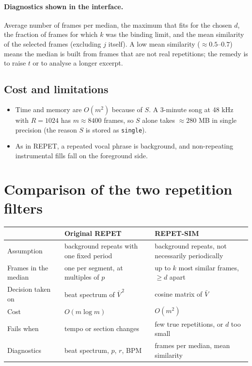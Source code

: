\documentclass[11pt,a4paper]{article}
\newcommand{\code}[1]{\texttt{#1}}
\begin{document}
\paragraph{Diagnostics shown in the interface.} Average number of frames
per median, the maximum that fits for the chosen $d$, the fraction of frames
for which $k$ was the binding limit, and the mean similarity of the selected
frames (excluding $j$ itself). A low mean similarity ($\approx0.5$--$0.7$)
means the median is built from frames that are not real repetitions; the
remedy is to raise $t$ or to analyse a longer excerpt.

\subsection{Cost and limitations}
\begin{itemize}
  \item Time and memory are $O(m^2)$ because of $S$. A 3-minute song at
        48 kHz with $R=1024$ has $m\approx8400$ frames, so $S$ alone takes
        $\approx280$ MB in single precision (the reason $S$ is stored as
        \code{single}).
  \item As in REPET, a repeated vocal phrase is background, and
        non-repeating instrumental fills fall on the foreground side.
\end{itemize}

\section{Comparison of the two repetition filters}

\begin{table}[htbp]
\centering
\begin{tabularx}{\linewidth}{@{}lLL@{}}
\toprule
 & Original REPET & REPET-SIM \\
\midrule
Assumption & background repeats with one fixed period & background repeats, not necessarily periodically \\
Frames in the median & one per segment, at multiples of $p$ & up to $k$ most similar frames, $\ge d$ apart \\
Decision taken on & beat spectrum of $\bar V^{\,2}$ & cosine matrix of $\bar V$ \\
Cost & $O(m\log m)$ & $O(m^2)$ \\
Fails when & tempo or section changes & few true repetitions, or $d$ too small \\
Diagnostics & beat spectrum, $p$, $r$, BPM & frames per median, mean similarity \\
\bottomrule
\end{tabularx}
\end{table}
\end{document}
